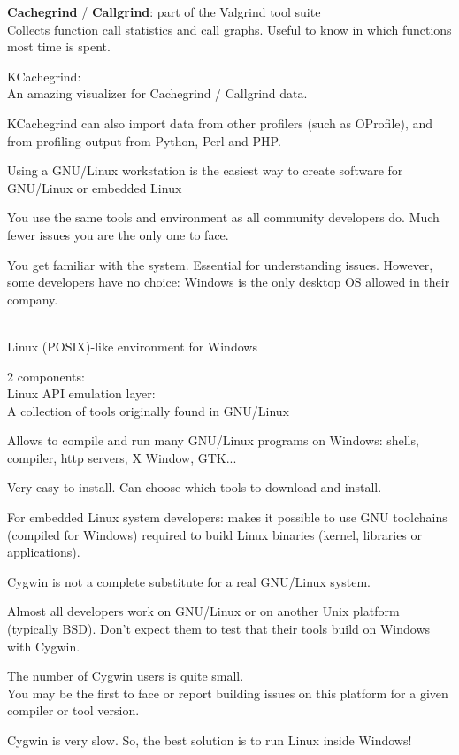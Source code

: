   \startitemize
  \item {\bf Cachegrind} / {\bf Callgrind}: part of the Valgrind tool suite\\
    Collects function call statistics and call graphs. Useful to know
    in which functions most time is spent.
  \item KCachegrind: \\
    An amazing visualizer for Cachegrind / Callgrind data.
  \item KCachegrind can also import data from other profilers (such as
    OProfile), and from profiling output from Python, Perl and PHP.
  \stopitemize


  Using a GNU/Linux workstation is the easiest way to create software
  for GNU/Linux or embedded Linux
  \startitemize
  \item You use the same tools and environment as all community
    developers do.  Much fewer issues you are the only one to face.
  \item You get familiar with the system.  Essential for understanding
    issues.
  \stopitemize
  However, some developers have no choice: Windows is the only desktop
  OS allowed in their company.

    \\
    Linux (POSIX)-like environment for Windows
    \startitemize
    \item 2 components:\\
      Linux API emulation layer: \\
      A collection of tools originally found in GNU/Linux
    \item Allows to compile and run many GNU/Linux programs on Windows: shells,
      compiler, http servers, X Window, GTK...
    \item Very easy to install. Can choose which tools to download and
      install.
    \item For embedded Linux system developers: makes it possible to use
      GNU toolchains (compiled for Windows) required to build Linux
      binaries (kernel, libraries or applications).
    \stopitemize

  Cygwin is not a complete substitute for a real GNU/Linux system.
  \startitemize
  \item Almost all developers work on GNU/Linux or on another Unix
    platform (typically BSD). Don't expect them to test that their
    tools build on Windows with Cygwin.
  \item The number of Cygwin users is quite small.\\
    You may be the first to face or report building issues on this
    platform for a given compiler or tool version.
  \item Cygwin is very slow.
  \stopitemize
  So, the best solution is to run Linux inside Windows!

